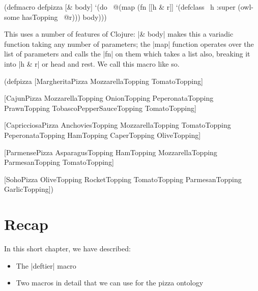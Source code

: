 \begin{tawny}
(defmacro defpizza [& body]
  `(do
    ~@(map
       (fn [[h & r]]
         `(defclass ~h :super
            (owl-some hasTopping ~@r)))
       body)))
\end{tawny}

This uses a number of features of Clojure: |& body| makes this a
variadic function taking any number of parameters; the |map| function
operates over the list of parameters and calls the |fn| on them which
takes a list also, breaking it into |h & r| or head and rest.  We call
this macro like so.

\begin{tawny}
(defpizza
 [MargheritaPizza MozzarellaTopping TomatoTopping]

 [CajunPizza MozzarellaTopping OnionTopping PeperonataTopping
  PrawnTopping TobascoPepperSauceTopping TomatoTopping]

 [CapricciosaPizza AnchoviesTopping MozzarellaTopping
  TomatoTopping PeperonataTopping HamTopping CaperTopping
  OliveTopping]

 [ParmensePizza AsparagusTopping
  HamTopping
  MozzarellaTopping
  ParmesanTopping
  TomatoTopping]

 [SohoPizza OliveTopping RocketTopping TomatoTopping ParmesanTopping
  GarlicTopping])
\end{tawny}

\section{Recap}
\label{sec:recap-advanced-pizza}


In this short chapter, we have described:

\begin{itemize}
\item The |deftier| macro
\item Two macros in detail that we can use for the pizza ontology
\end{itemize}

